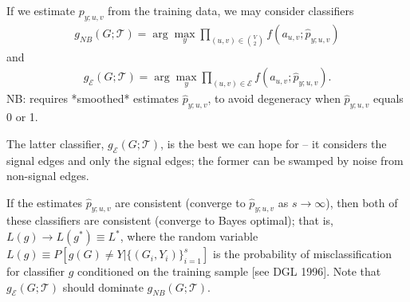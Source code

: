\documentclass{article}
\newcommand{\mcE}{\mathcal{E}}
\newcommand{\mcT}{\mathcal{T}}
\newcommand{\hatp}{\widehat{p}}
\begin{document}
If we estimate $p_{y;u,v}$ from the training data,
we may consider classifiers
\begin{eqnarray}
g_{NB}(G;\mcT) = \arg\max_y \prod_{(u,v) \in {V \choose 2}} f(a_{u,v};\hatp_{y;u,v})
\end{eqnarray}
and
\begin{eqnarray}
g_{\mcE}(G;\mcT) = \arg\max_y \prod_{(u,v) \in \mcE} f(a_{u,v};\hatp_{y;u,v}).
\end{eqnarray}
NB: requires *smoothed* estimates $\hatp_{y;u,v}$,
to avoid degeneracy when $\hatp_{y;u,v}$ equals 0 or 1.

The latter classifier, $g_{\mcE}(G;\mcT)$,
is the best we can hope for -- it considers the signal edges and only the signal edges;
the former can be swamped by noise from non-signal edges.

If the estimates $\hatp_{y;u,v}$ are consistent (converge to $\hatp_{y;u,v}$ as $s \rightarrow \infty$),
then both of these classifiers are consistent (converge to Bayes optimal);
that is, $L(g) \rightarrow L(g^*) \equiv L^*$,
where the random variable $L(g) \equiv P[g(G) \neq Y| \{(G_i,Y_i)\}_{i=1}^s]$
is the probability of misclassification for classifier $g$
conditioned on the training sample [see DGL 1996].
Note that $g_{\mcE}(G;\mcT)$ should dominate $g_{NB}(G;\mcT)$.
\end{document}
